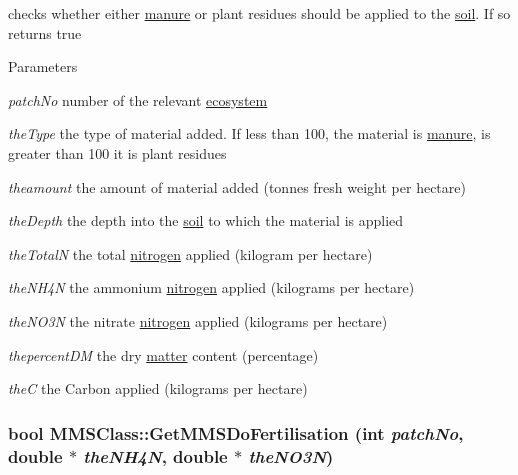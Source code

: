 checks whether either \hyperlink{classmanure}{manure} or plant residues should be applied to the \hyperlink{classsoil}{soil}. If so returns true 
\begin{DoxyParams}{Parameters}
\item[{\em patchNo}]number of the relevant \hyperlink{classecosystem}{ecosystem} \item[{\em theType}]the type of material added. If less than 100, the material is \hyperlink{classmanure}{manure}, is greater than 100 it is plant residues \item[{\em theamount}]the amount of material added (tonnes fresh weight per hectare) \item[{\em theDepth}]the depth into the \hyperlink{classsoil}{soil} to which the material is applied \item[{\em theTotalN}]the total \hyperlink{classnitrogen}{nitrogen} applied (kilogram per hectare) \item[{\em theNH4N}]the ammonium \hyperlink{classnitrogen}{nitrogen} applied (kilograms per hectare) \item[{\em theNO3N}]the nitrate \hyperlink{classnitrogen}{nitrogen} applied (kilograms per hectare) \item[{\em thepercentDM}]the dry \hyperlink{classmatter}{matter} content (percentage) \item[{\em theC}]the Carbon applied (kilograms per hectare) \end{DoxyParams}
\hypertarget{class_m_m_s_class_af4ca114efc64eb0fc38e9bb00f1d880b}{
\subsubsection[{GetMMSDoFertilisation}]{\setlength{\rightskip}{0pt plus 5cm}bool MMSClass::GetMMSDoFertilisation (int {\em patchNo}, \/  double $\ast$ {\em theNH4N}, \/  double $\ast$ {\em theNO3N})}}
\label{class_m_m_s_class_af4ca114efc64eb0fc38e9bb00f1d880b}


